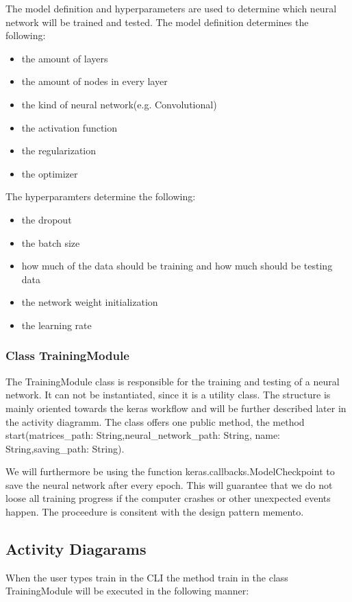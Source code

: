 \documentclass[parskip=full]{scrartcl}
\begin{document}
The model definition and hyperparameters are used to determine which \gls{neural network} will be trained and tested.
The model definition determines the following:
\begin{itemize}
\item the amount of layers
\item the amount of nodes in every layer
\item the kind of \gls{neural network}(e.g. Convolutional)
\item the activation function
\item the regularization
\item the optimizer
\end{itemize}

The hyperparamters determine the following:

\begin{itemize}
\item the dropout
\item the batch size
\item how much of the data should be training and how much should be testing data
\item the network weight initialization
\item the learning rate
\end{itemize}

\subsubsection{Class TrainingModule}
The TrainingModule class is responsible for the training and testing of a \gls{neural network}.
It can not be instantiated, since it is a utility class.
The structure is mainly oriented towards the keras workflow and will be further described later in the activity diagramm.
The class offers one public method, the method start(matrices\_path: String,neural\_network\_path: String,
name: String,saving\_path: String). \newline

We will furthermore be using the function keras.callbacks.ModelCheckpoint to save the \gls{neural network} after every epoch.
This will guarantee that we do not loose all training progress if the computer crashes or other unexpected events happen.
The proceedure is consitent with the design pattern \gls{memento}.


\subsection{Activity Diagarams}
When the user types train in the \gls{CLI} the method train in the class TrainingModule will be executed in the following manner:
\end{document}
